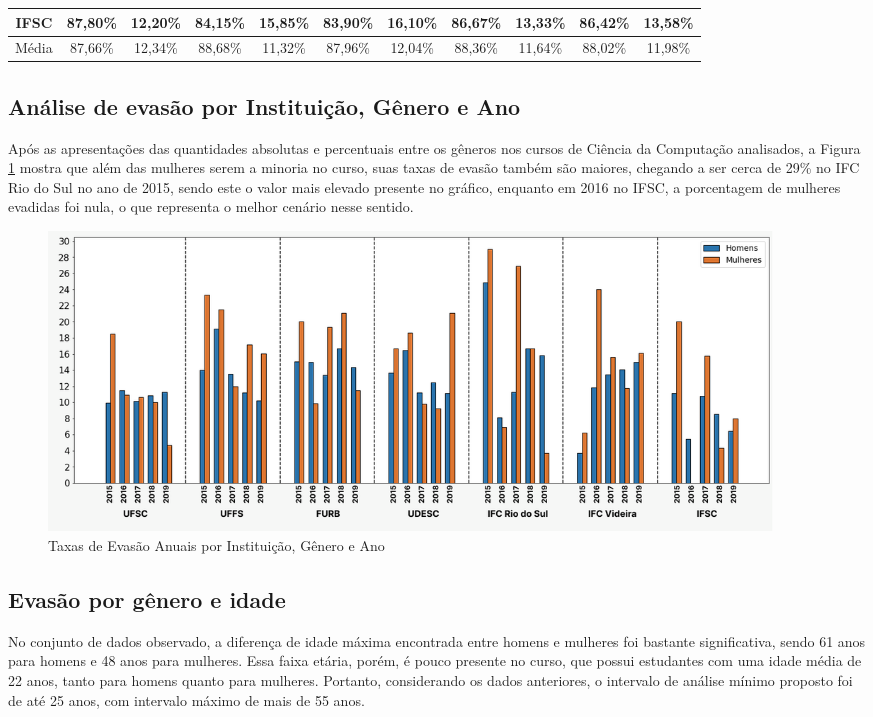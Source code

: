 \documentclass[a4paper]{article}
\begin{document}
\begin{table}[ht]
{\begin{tabular}{|c|cc|cc|cc|cc|cc|}
IFSC                                    & \multicolumn{1}{c|}{87,80\%} & 12,20\% & \multicolumn{1}{c|}{84,15\%} & 15,85\% & \multicolumn{1}{c|}{83,90\%} & 16,10\% & \multicolumn{1}{c|}{86,67\%} & 13,33\% & \multicolumn{1}{c|}{86,42\%} & 13,58\% \\ \hline
\hline

Média                                    & \multicolumn{1}{c|}{87,66\%} & 12,34\% & \multicolumn{1}{c|}{88,68\%} & 11,32\% & \multicolumn{1}{c|}{87,96\%} & 12,04\% & \multicolumn{1}{c|}{88,36\%} & 11,64\% & \multicolumn{1}{c|}{88,02\%} & 11,98\% \\ \hline

\end{tabular}
} 
\end{table}

\subsection{Análise de evasão por Instituição,  Gênero e Ano}\label{graf:generoanual}

Após as apresentações das quantidades absolutas e percentuais entre os gêneros nos cursos de Ciência da Computação analisados, a Figura \ref{fig:exampleFig2} mostra que além das mulheres serem a minoria no curso, suas taxas de evasão também são  maiores, chegando a ser cerca de 29\% no IFC Rio do Sul no ano de 2015, sendo este o valor mais elevado presente no gráfico, enquanto em 2016 no IFSC, a porcentagem de mulheres evadidas foi nula, o que representa o melhor cenário nesse sentido.

\begin{figure}[ht]
\centering
\includegraphics[width=0.93\textwidth]{taxa_de_evasao.png}
\caption{Taxas de Evasão Anuais por Instituição, Gênero e Ano}
\label{fig:exampleFig2}
\end{figure}

\subsection{Evasão por gênero e idade}\label{graf:generoeidade}
No conjunto de dados observado, a diferença de idade máxima encontrada entre homens e mulheres foi bastante significativa, sendo 61 anos para homens e 48 anos para mulheres. Essa faixa etária, porém, é pouco presente no curso, que possui estudantes com uma idade média de 22 anos, tanto para homens quanto para mulheres. Portanto, considerando os dados anteriores, o intervalo de análise mínimo proposto foi de até 25 anos, com intervalo máximo de mais de 55 anos. 
\end{document}
